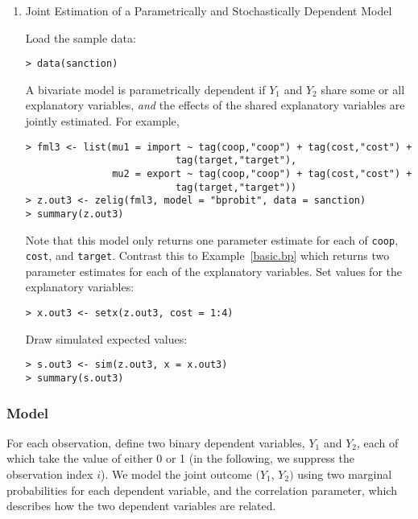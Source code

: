 \begin{enumerate}
\item Joint Estimation of a Parametrically and Stochastically
Dependent Model 
\label{pdep.p}
  
Load the sample data:  
\begin{verbatim}
> data(sanction)
\end{verbatim}
A bivariate model is parametrically dependent if $Y_1$ and $Y_2$ share
some or all explanatory variables, {\it and} the effects of the shared
explanatory variables are jointly estimated.  For example,
\begin{verbatim}
> fml3 <- list(mu1 = import ~ tag(coop,"coop") + tag(cost,"cost") + 
                          tag(target,"target"), 
               mu2 = export ~ tag(coop,"coop") + tag(cost,"cost") + 
                          tag(target,"target"))
> z.out3 <- zelig(fml3, model = "bprobit", data = sanction)
> summary(z.out3)
\end{verbatim}
Note that this model only returns one parameter estimate for each of
{\tt coop}, {\tt cost}, and {\tt target}.  Contrast this to
Example~\ref{basic.bp} which returns two parameter estimates for each
of the explanatory variables.  \newline \newline Set values for the
explanatory variables:
\begin{verbatim}
> x.out3 <- setx(z.out3, cost = 1:4)
\end{verbatim} 
Draw simulated expected values:  
\begin{verbatim}
> s.out3 <- sim(z.out3, x = x.out3)
> summary(s.out3)
\end{verbatim}

\end{enumerate}

\subsubsection{Model}

For each observation, define two binary dependent variables, $Y_1$ and
$Y_2$, each of which take the value of either 0 or 1 (in the
following, we suppress the observation index $i$).  We model the joint
outcome $(Y_1$, $Y_2)$ using two marginal probabilities for each
dependent variable, and the correlation parameter, which describes how
the two dependent variables are related. 

